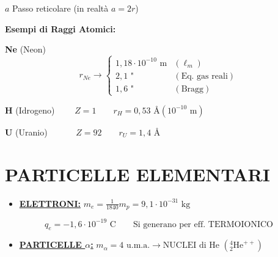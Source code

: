 \documentclass[12pt,a4paper]{article}
\begin{document}
\noindent $a$ Passo reticolare \quad (in realtà $a = 2r$)

\vspace{0.8cm}
\noindent \textbf{Esempi di Raggi Atomici:}

\vspace{0.3cm}
\noindent \textbf{Ne} (Neon)
\begin{equation*}
    r_{Ne} \rightarrow \begin{cases}
        1,18 \cdot 10^{-10} \text{ m} & (\ell_m) \\
        2,1 \text{ "} & (\text{Eq. gas reali}) \\
        1,6 \text{ "} & (\text{Bragg})
    \end{cases}
\end{equation*}

\vspace{0.3cm}
\noindent \textbf{H} (Idrogeno) $\qquad Z=1 \qquad r_H = 0,53 \text{ \AA } (10^{-10} \text{ m})$

\vspace{0.3cm}
\noindent \textbf{U} (Uranio) $\qquad\quad Z=92 \qquad r_U = 1,4 \text{ \AA}$

\newpage
\section*{PARTICELLE ELEMENTARI}

\begin{itemize}
    \item \underline{\textbf{ELETTRONI:}} \qquad $m_e = \frac{1}{1840} m_p = 9,1 \cdot 10^{-31} \text{ kg}$
\end{itemize}

\begin{equation*}
    q_e = -1,6 \cdot 10^{-19} \text{ C} \qquad \text{Si generano per eff. TERMOIONICO}
\end{equation*}


\vspace{0.8cm}
\begin{itemize}
    \item \underline{\textbf{PARTICELLE $\alpha$:}} \qquad $m_\alpha = 4 \text{ u.m.a.} \rightarrow \text{NUCLEI di He } \left( ^4_2\text{He}^{++} \right)$
\end{itemize}
\end{document}
